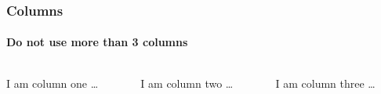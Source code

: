 \begin{frame}
\frametitle{Columns}
\framesubtitle{Do not use more than 3 columns}
\begin{columns}[t, onlytextwidth]
  \begin{column}{.31\textwidth}
    \begin{block}{I am column one}
      \dots
    \end{block}
  \end{column}
  \begin{column}{.31\textwidth}
    \begin{block}{I am column two}
      \dots
    \end{block}
  \end{column}
  \begin{column}{.31\textwidth}
    \begin{block}{I am column three}
      \dots
    \end{block}
  \end{column}
\end{columns}
\end{frame}
